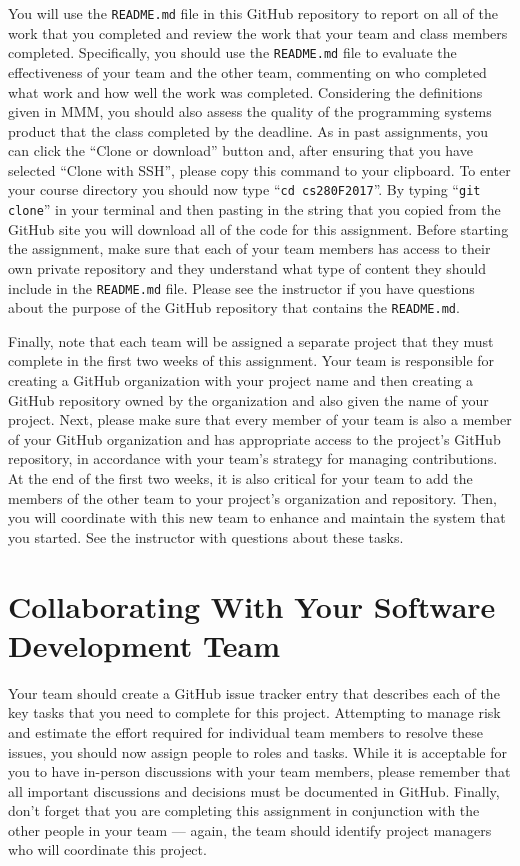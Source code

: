 \documentclass[11pt]{article}
\newcommand{\reflection}{\lstinline{README.md}}
\newcommand{\command}[1]{``\lstinline{#1}''}
\begin{document}
You will use the \reflection{} file in this GitHub repository to report on all of the work that you completed and review
the work that your team and class members completed. Specifically, you should use the \reflection{} file to evaluate the
effectiveness of your team and the other team, commenting on who completed what work and how well the work was
completed. Considering the definitions given in MMM, you should also assess the quality of the programming systems
product that the class completed by the deadline. As in past assignments, you can click the ``Clone or download'' button
and, after ensuring that you have selected ``Clone with SSH'', please copy this command to your clipboard. To enter your
course directory you should now type \command{cd cs280F2017}. By typing \command{git clone} in your terminal and then
pasting in the string that you copied from the GitHub site you will download all of the code for this assignment. Before
starting the assignment, make sure that each of your team members has access to their own private repository and they
understand what type of content they should include in the \reflection{} file. Please see the instructor if you have
questions about the purpose of the GitHub repository that contains the \reflection{}.

Finally, note that each team will be assigned a separate project that they must complete in the first two weeks of this
assignment. Your team is responsible for creating a GitHub organization with your project name and then creating a
GitHub repository owned by the organization and also given the name of your project. Next, please make sure that every
member of your team is also a member of your GitHub organization and has appropriate access to the project's GitHub
repository, in accordance with your team's strategy for managing contributions. At the end of the first two weeks, it is
also critical for your team to add the members of the other team to your project's organization and repository. Then,
you will coordinate with this new team to enhance and maintain the system that you started. See the instructor
with questions about these tasks.

\section*{Collaborating With Your Software Development Team}

Your team should create a GitHub issue tracker entry that describes each of the key tasks that you need to complete for
this project. Attempting to manage risk and estimate the effort required for individual team members to resolve these
issues, you should now assign people to roles and tasks. While it is acceptable for you to have in-person discussions
with your team members, please remember that all important discussions and decisions must be documented in GitHub.
Finally, don't forget that you are completing this assignment in conjunction with the other people in your team ---
again, the team should identify project managers who will coordinate this project.
\end{document}
